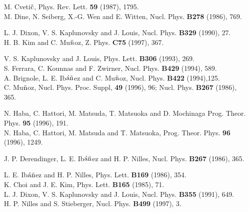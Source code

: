 \begin{thebibliography}{99}
M. Cveti$\check{\rm c}$, Phys. Rev. Lett. {\bf 59} (1987), 1795. \\
M. Dine, N. Seiberg, X.-G. Wen and E. Witten, 
                          Nucl. Phys. {\bf B278} (1986), 769. 


L. J. Dixon, V. S. Kaplunovsky and J. Louis, 
                        Nucl. Phys. {\bf B329} (1990), 27. \\
H. B. Kim and C. Mu$\tilde{\rm n}$oz, Z. Phys. {\bf C75} (1997), 367. 


V. S. Kaplunovsky and J. Louis, Phys. Lett. {\bf B306} (1993), 269. \\
S. Ferrara, C. Kounnas and F. Zwirner, 
                       Nucl. Phys. {\bf B429} (1994), 589. \\
A. Brignole, L. E. Ib$\acute{\rm a}\tilde{\rm n}$ez and 
    C. Mu$\tilde{\rm n}$oz, Nucl. Phys. {\bf B422} (1994),125. \\
C. Mu$\tilde{\rm n}$oz, Nucl. Phys. Proc. Suppl, {\bf 49} (1996), 96; 
                 Nucl. Phys. {\bf B267} (1986), 365. 


N. Haba, C. Hattori, M. Matsuda, T. Matsuoka and D. Mochinaga 
                   Prog. Theor. Phys. {\bf 95} (1996), 191. \\
N. Haba, C. Hattori, M. Matsuda and T. Matsuoka, 
                   Prog. Theor. Phys. {\bf 96} (1996), 1249. 


J. P. Derendinger, L. E. Ib$\acute{\rm a}\tilde{\rm n}$ez and 
               H. P. Nilles, Nucl. Phys. {\bf B267} (1986), 365. 


L. E. Ib$\acute{\rm a}\tilde{\rm n}$ez and H. P. Nilles, 
                      Phys. Lett. {\bf B169} (1986), 354. \\
K. Choi and J. E. Kim, Phys. Lett. {\bf B165} (1985), 71. \\
L. J. Dixon, V. S. Kaplunovsky and J. Louis, 
                      Nucl. Phys. {\bf B355} (1991), 649. \\
H. P. Nilles and S. Stieberger, Nucl. Phys. {\bf B499} (1997), 3.

\end{thebibliography}



 

